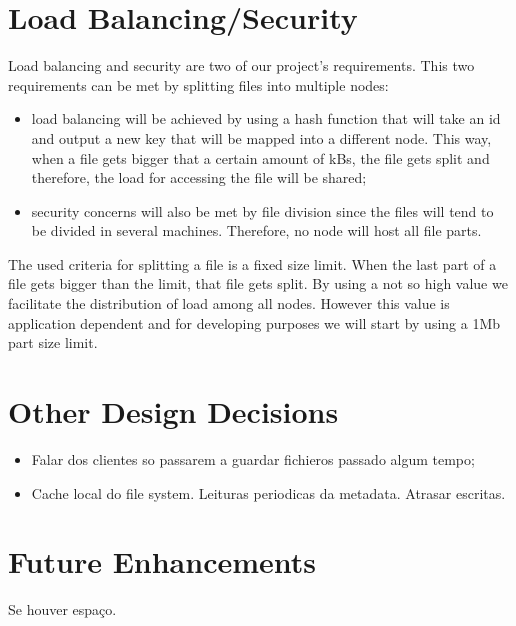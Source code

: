 \documentclass[times,9pt,article]{llncs}
\begin{document}
\section{Load Balancing/Security}

Load balancing and security are two of our project's requirements. This two 
requirements can be met by splitting files into multiple nodes:
\begin{itemize}
\item load balancing will be achieved by using a hash function that will take
an id and output a new key that will be mapped into a different node. This way,
when a file gets bigger that a certain amount of kBs, the file gets split and
therefore, the load for accessing the file will be shared;
\item security concerns will also be met by file division since the files will
tend to be divided in several machines. Therefore, no node will host all file
parts.
\end{itemize} 

The used criteria for splitting a file is a fixed size limit. When the last part
of a file gets bigger than the limit, that file gets split. By using a not so high
value we facilitate the distribution of load among all nodes. However this value
is application dependent and for developing purposes we will start by using a
1Mb part size limit.   

\section{Other Design Decisions}
\begin{itemize}
\item Falar dos clientes so passarem a guardar fichieros passado algum tempo;
\item Cache local do file system. Leituras periodicas da metadata. Atrasar escritas.
\end{itemize}

\section{Future Enhancements}
Se houver espaço.
\end{document}
